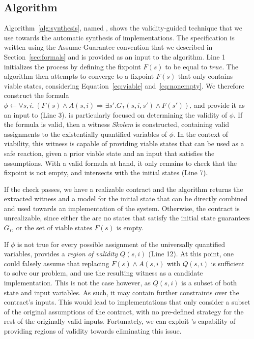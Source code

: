 \subsection{Algorithm}
\label{sec:alg}
Algorithm~\ref{alg:synthesis}, named \jsynvg, shows the validity-guided technique that we use towards the automatic synthesis of implementations. The specification is written using the Assume-Guarantee convention that we described in Section~\ref{sec:formals} and is provided as an input to the algorithm.
Line 1 initializes the process by defining the fixpoint $F(s)$ to be equal to
$true$. The algorithm then attempts to converge to a fixpoint $F(s)$
that only contains viable states, considering Equation~\ref{eq:viable}
and~\ref{eq:nonempty}.
We therefore construct the formula $\phi \gets \forall s,i. \ (F(s) \land A(s,i)
\Rightarrow \exists s'. G_{T}(s,i,s') \land F(s'))$, and provide it as an input to \aeval (Line 3). \aeval is particularly
focused on determining the validity of $\phi$. If the formula is valid, then a witness
\textit{Skolem} is constructed, containing valid assignments to the
existentially quantified variables of $\phi$. In the context of viability, this
witness is capable of providing viable states that can be used as a safe
reaction, given a prior viable state and an input that
satisfies the assumptions. With a valid formula at hand, it only remains to check that the fixpoint is not empty, and intersects with the initial states (Line 7).

If the check passes, we have a realizable contract and the algorithm returns the extracted witness and a model for the initial state that can be directly combined and used towards an implementation of the system. Otherwise, the contract is unrealizable, since either the are no states that satisfy the
initial state guarantees $G_I$, or the set of viable states $F(s)$ is empty. 


If $\phi$ is not true for every possible assignment of the universally
quantified variables, \aeval provides a \textit{region of validity} $Q(s,i)$
(Line 12).
At this point, one could falsely assume that replacing $F(s) \land A(s,i)$ with
$Q(s,i)$ is sufficient to solve our problem, and use the resulting witness as a
candidate implementation. This is not the case however, as $Q(s,i)$ is a subset
of both state and input variables. As such, it may contain further constraints
over the contract's inputs. This would lead to implementations that only
consider a subset of the original assumptions of the contract, with no
pre-defined strategy for the rest of the originally valid inputs.
Fortunately, we can exploit \aeval's capability of providing regions of validity
towards eliminating this issue.

